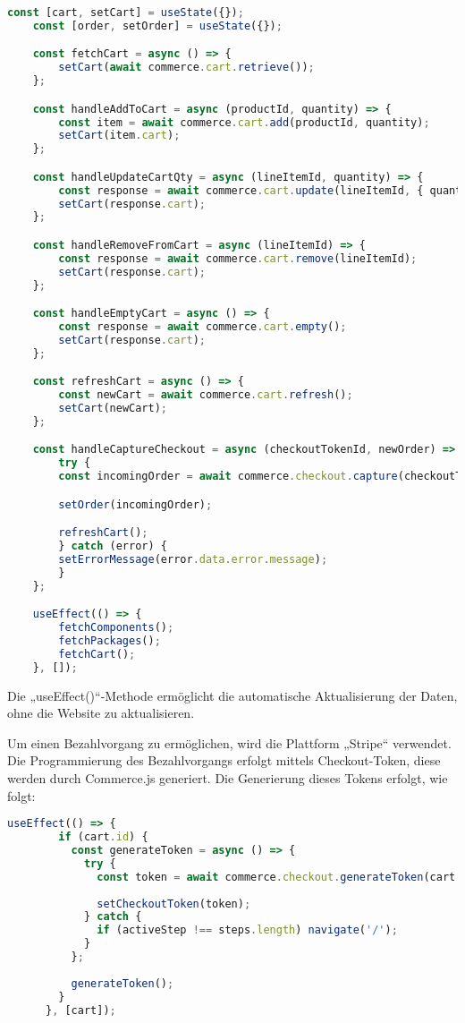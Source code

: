 \begin{lstlisting}[language=JavaScript, caption=Warenkorb, label=lst:impl:cart]
    const [cart, setCart] = useState({});
    const [order, setOrder] = useState({});

    const fetchCart = async () => {
        setCart(await commerce.cart.retrieve());
    };

    const handleAddToCart = async (productId, quantity) => {
        const item = await commerce.cart.add(productId, quantity);
        setCart(item.cart);
    };

    const handleUpdateCartQty = async (lineItemId, quantity) => {
        const response = await commerce.cart.update(lineItemId, { quantity });
        setCart(response.cart);
    };

    const handleRemoveFromCart = async (lineItemId) => {
        const response = await commerce.cart.remove(lineItemId);
        setCart(response.cart);
    };

    const handleEmptyCart = async () => {
        const response = await commerce.cart.empty();
        setCart(response.cart);
    };

    const refreshCart = async () => {
        const newCart = await commerce.cart.refresh();
        setCart(newCart);
    };

    const handleCaptureCheckout = async (checkoutTokenId, newOrder) => {
        try {
        const incomingOrder = await commerce.checkout.capture(checkoutTokenId, newOrder);

        setOrder(incomingOrder);

        refreshCart();
        } catch (error) {
        setErrorMessage(error.data.error.message);
        }
    };

    useEffect(() => {
        fetchComponents();
        fetchPackages();
        fetchCart();
    }, []);
\end{lstlisting}

Die „useEffect()“-Methode ermöglicht die automatische Aktualisierung der Daten, ohne die Website zu aktualisieren.

Um einen Bezahlvorgang zu ermöglichen, wird die Plattform „Stripe“ verwendet. Die Programmierung des Bezahlvorgangs erfolgt mittels Checkout-Token, diese werden durch Commerce.js generiert. Die Generierung dieses Tokens erfolgt, wie folgt: \\

\begin{lstlisting}[language=JavaScript, caption=Generierung des Tokens]
    useEffect(() => {
        if (cart.id) {
          const generateToken = async () => {
            try {
              const token = await commerce.checkout.generateToken(cart.id, { type: 'cart' });
    
              setCheckoutToken(token);
            } catch {
              if (activeStep !== steps.length) navigate('/');
            }
          };
    
          generateToken();
        }
      }, [cart]);
\end{lstlisting}

